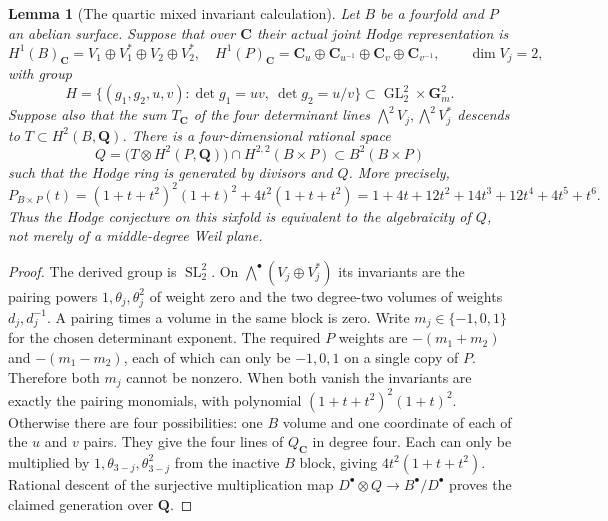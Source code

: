\documentclass[11pt,reqno]{article}
\theoremstyle{emphasizedplain}
\newtheorem{lemma}[theorem]{Lemma}
\theoremstyle{emphasizeddefinition}
\theoremstyle{emphasizeddefinition}
\DeclareMathOperator{\GL}{GL}
\DeclareMathOperator{\SL}{SL}
\newcommand{\Q}{\mathbf Q}
\newcommand{\C}{\mathbf C}
\newcommand{\B}{B}
\newcommand{\D}{D}
\begin{document}
\begin{lemma}[The quartic mixed invariant calculation]\label{p:quartic-mixed}
Let $B$ be a fourfold and $P$ an abelian surface. Suppose that over
$\C$ their actual joint Hodge representation is
\[
 H^1(B)_\C=V_1\oplus V_1^*\oplus V_2\oplus V_2^*,\quad
 H^1(P)_\C=\C_u\oplus\C_{u^{-1}}\oplus\C_v\oplus\C_{v^{-1}},
 \qquad \dim V_j=2,
\]
with group
\[
 H=\{(g_1,g_2,u,v):\det g_1=uv,\ \det g_2=u/v\}
 \subset\GL_2^2\times\mathbf G_m^2.
\]
Suppose also that the sum $T_\C$ of the four determinant lines
$\bigwedge^2V_j,\bigwedge^2V_j^*$ descends to
$T\subset H^2(B,\Q)$. There is a four-dimensional rational space
\[
 Q=\bigl(T\otimes H^2(P,\Q)\bigr)\cap H^{2,2}(B\times P)
 \subset\B^2(B\times P)
\]
such that the Hodge ring is generated by divisors and $Q$. More precisely,
\[
 P_{B\times P}(t)=(1+t+t^2)^2(1+t)^2+4t^2(1+t+t^2)
 =1+4t+12t^2+14t^3+12t^4+4t^5+t^6.
\]
Thus the Hodge conjecture on this sixfold is equivalent to the
algebraicity of $Q$, not merely of a middle-degree Weil plane.
\end{lemma}
\begin{proof}
The derived group is $\SL_2^2$. On
$\bigwedge^\bullet(V_j\oplus V_j^*)$ its invariants are the
pairing powers $1,\theta_j,\theta_j^2$ of weight zero and the two
degree-two volumes of weights $d_j,d_j^{-1}$. A pairing times a
volume in the same block is zero. Write $m_j\in\{-1,0,1\}$ for
the chosen determinant exponent. The required $P$ weights are
$-(m_1+m_2)$ and $-(m_1-m_2)$, each of which can only be $-1,0,1$
on a single copy of $P$. Therefore both $m_j$ cannot be nonzero.
When both vanish the invariants are exactly the pairing monomials,
with polynomial $(1+t+t^2)^2(1+t)^2$. Otherwise there are four
possibilities: one $B$ volume and one coordinate of each of the
$u$ and $v$ pairs. They give the four lines of $Q_\C$ in degree four.
Each can only be multiplied by $1,\theta_{3-j},\theta_{3-j}^2$
from the inactive $B$ block, giving $4t^2(1+t+t^2)$.
Rational descent of the surjective multiplication map
$\D^\bullet\otimes Q\to\B^\bullet/\D^\bullet$
proves the claimed generation over $\Q$.
\end{proof}
\end{document}
